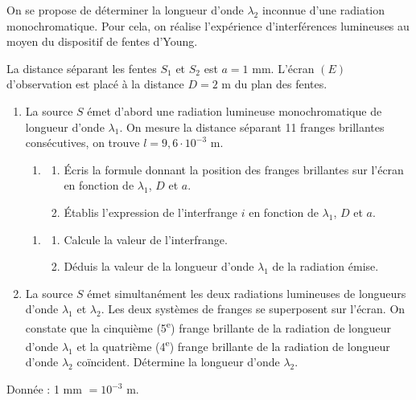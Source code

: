 \documentclass[11pt]{article}
\begin{document}
On se propose de déterminer la longueur d'onde $\lambda_2$ inconnue d'une radiation monochromatique. Pour cela, on réalise l'expérience d'interférences lumineuses au moyen du dispositif de fentes d'Young.

\begin{center}
\end{center}

\noindent La distance séparant les fentes $S_1$ et $S_2$ est $a = 1$ mm. L'écran $(E)$ d'observation est placé à la distance $D = 2$ m du plan des fentes.

\begin{enumerate}
  \item La source $S$ émet d'abord une radiation lumineuse monochromatique de longueur d'onde $\lambda_1$. On mesure la distance séparant 11 franges brillantes consécutives, on trouve $l = 9{,}6\cdot10^{-3}$ m.
  \begin{enumerate}[label=1.1.]
    \item \begin{enumerate}[label=\alph*.]
      \item Écris la formule donnant la position des franges brillantes sur l'écran en fonction de $\lambda_1$, $D$ et $a$.
      \item Établis l'expression de l'interfrange $i$ en fonction de $\lambda_1$, $D$ et $a$.
    \end{enumerate}
  \end{enumerate}
  \begin{enumerate}[label=1.2.]
    \item \begin{enumerate}[label=\alph*.]
      \item Calcule la valeur de l'interfrange.
      \item Déduis la valeur de la longueur d'onde $\lambda_1$ de la radiation émise.
    \end{enumerate}
  \end{enumerate}
  \item La source $S$ émet simultanément les deux radiations lumineuses de longueurs d'onde $\lambda_1$ et $\lambda_2$. Les deux systèmes de franges se superposent sur l'écran. On constate que la cinquième (5\textsuperscript{e}) frange brillante de la radiation de longueur d'onde $\lambda_1$ et la quatrième (4\textsuperscript{e}) frange brillante de la radiation de longueur d'onde $\lambda_2$ coïncident. Détermine la longueur d'onde $\lambda_2$.
\end{enumerate}
\noindent Donnée : 1 mm $= 10^{-3}$ m.
\end{document}
